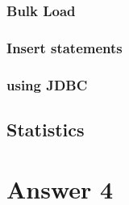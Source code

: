 \documentclass[10pt]{article}
\begin{document}
\subsubsection{Bulk Load}
\subsubsection{Insert statements}
\subsubsection{using JDBC}
\subsection{Statistics}

\section{Answer 4}
\end{document}
